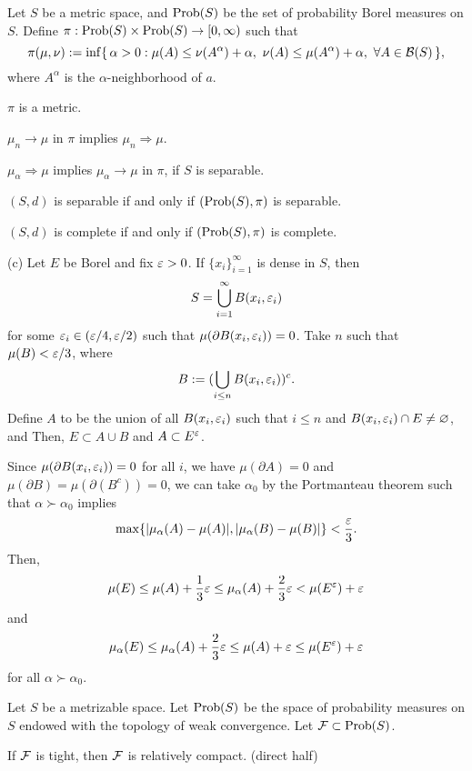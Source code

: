 \documentclass{../note}
\begin{document}
\begin{prb}
Let $S$ be a metric space, and $\operatorname{Prob}(S)$ be the set of probability Borel measures on $S$.
Define $\pi:\operatorname{Prob}(S)\times\operatorname{Prob}(S)\to[0,\infty)$ such that
\[\pi(\mu,\nu):=\inf\{\,\alpha>0:\mu(A)\le\nu(A^\alpha)+\alpha,\ \nu(A)\le\mu(A^\alpha)+\alpha,\ \forall A\in\cB(S)\,\},\]
where $A^\alpha$ is the $\alpha$-neighborhood of $a$.
\begin{parts}
\item $\pi$ is a metric.
\item $\mu_n\to\mu$ in $\pi$ implies $\mu_n\Rightarrow\mu$.
\item $\mu_\alpha\Rightarrow\mu$ implies $\mu_\alpha\to\mu$ in $\pi$, if $S$ is separable.
\item $(S,d)$ is separable if and only if $(\operatorname{Prob}(S),\pi)$ is separable.
\item $(S,d)$ is complete if and only if $(\operatorname{Prob}(S),\pi)$ is complete.
\end{parts}
\end{prb}
\begin{pf}
(c)
Let $E$ be Borel and fix $\varepsilon>0$.
If $\{x_i\}_{i=1}^\infty$ is dense in $S$, then
\[S=\bigcup_{i=1}^\infty B(x_i,\varepsilon_i)\]
for some $\varepsilon_i\in(\varepsilon/4,\varepsilon/2)$ such that $\mu(\partial B(x_i,\varepsilon_i))=0$.
Take $n$ such that $\mu(B)<\varepsilon/3$, where
\[B:=(\bigcup_{i\le n}B(x_i,\varepsilon_i))^c.\]
Define $A$ to be the union of all $B(x_i,\varepsilon_i)$ such that $i\le n$ and $B(x_i,\varepsilon_i)\cap E\ne\varnothing$, and
Then, $E\subset A\cup B$ and $A\subset E^\varepsilon$.

Since $\mu(\partial B(x_i,\varepsilon_i))=0$ for all $i$, we have $\mu(\partial A)=0$ and $\mu(\partial B)=\mu(\partial(B^c))=0$, we can take $\alpha_0$ by the Portmanteau theorem such that $\alpha\succ\alpha_0$ implies
\[\max\{|\mu_\alpha(A)-\mu(A)|,|\mu_\alpha(B)-\mu(B)|\}<\frac{\varepsilon}3.\]
Then,
\[\mu(E)\le\mu(A)+\frac13\varepsilon\le\mu_\alpha(A)+\frac23\varepsilon<\mu(E^\varepsilon)+\varepsilon\]
and
\[\mu_\alpha(E)\le\mu_\alpha(A)+\frac23\varepsilon\le\mu(A)+\varepsilon\le\mu(E^\varepsilon)+\varepsilon\]
for all $\alpha\succ\alpha_0$.
\end{pf}

\begin{prb}
Let $S$ be a metrizable space.
Let $\operatorname{Prob}(S)$ be the space of probability measures on $S$ endowed with the topology of weak convergence.
Let $\mathcal{F}\subset\operatorname{Prob}(S)$.
\begin{parts}
\item 
\item If $\mathcal{F}$ is tight, then $\mathcal{F}$ is relatively compact. (direct half)
\end{parts}
\end{prb}
\end{document}
